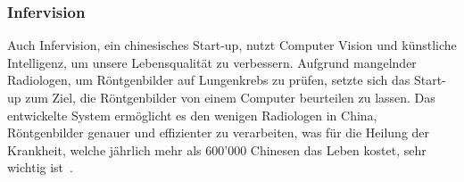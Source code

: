 \subsubsection{Infervision}

Auch Infervision, ein chinesisches Start-up, nutzt Computer Vision und künstliche Intelligenz, um unsere Lebensqualität zu verbessern. Aufgrund mangelnder Radiologen, um Röntgenbilder auf Lungenkrebs zu prüfen, setzte sich das Start-up zum Ziel, die Röntgenbilder von einem Computer beurteilen zu lassen. Das entwickelte System ermöglicht es den wenigen Radiologen in China, Röntgenbilder genauer und effizienter zu verarbeiten, was für die Heilung der Krankheit, welche jährlich mehr als 600'000 Chinesen das Leben kostet, sehr wichtig ist~\autocite{Infervision}.











